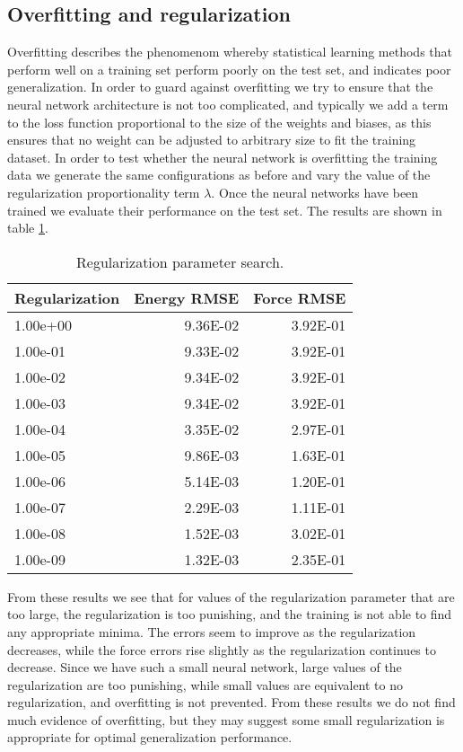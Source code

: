 \subsection{Overfitting and regularization}
Overfitting describes the phenomenom whereby statistical learning methods
that perform well on a training set perform poorly on the test set,
and indicates poor generalization.
In order to guard against overfitting we try to ensure that the
neural network architecture is not too complicated, and typically
we add a term to the loss function proportional
to the size of the weights and biases,
as this ensures that no weight can be adjusted to arbitrary size
to fit the training dataset.
In order to test whether the neural network is overfitting the training
data we generate the same configurations as before and vary
the value of the regularization proportionality term $\lambda$.
Once the neural networks have been trained we evaluate their
performance on the test set. The results are shown in table \ref{table:overfit}.

\begin{table}[H]
\centering
\begin{tabular}{lrr} 
\toprule
Regularization &  Energy RMSE &  Force RMSE \\
\midrule
     1.00e+00 &     9.36E-02 &    3.92E-01 \\
     1.00e-01 &     9.33E-02 &    3.92E-01 \\
     1.00e-02 &     9.34E-02 &    3.92E-01 \\
     1.00e-03 &     9.34E-02 &    3.92E-01 \\
     1.00e-04 &     3.35E-02 &    2.97E-01 \\
     1.00e-05 &     9.86E-03 &    1.63E-01 \\
     1.00e-06 &     5.14E-03 &    1.20E-01 \\
     1.00e-07 &     2.29E-03 &    1.11E-01 \\
     1.00e-08 &     1.52E-03 &    3.02E-01 \\
     1.00e-09 &     1.32E-03 &    2.35E-01 \\
\bottomrule
\end{tabular}
\caption{Regularization parameter search.}
\label{table:overfit}
\end{table}

From these results we see that for values of the regularization parameter
that are too large, the regularization is too punishing,
and the training is not able to find any appropriate minima.
The errors seem to improve as the regularization decreases,
while the force errors rise slightly as the regularization continues
to decrease.
Since we have such a small neural network, large values of the regularization
are too punishing, while small values are equivalent to no regularization,
and overfitting is not prevented. 
From these results we do not find much evidence of overfitting, but
they may suggest some small regularization is appropriate for
optimal generalization performance.

